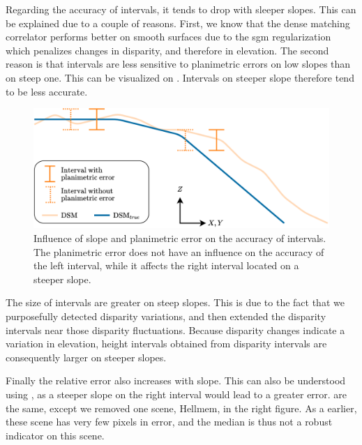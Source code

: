 Regarding the accuracy of intervals, it tends to drop with sleeper slopes. This can be explained due to a couple of reasons. First, we know that the dense matching correlator performs better on smooth surfaces due to the \acrshort{sgm} regularization which penalizes changes in disparity, and therefore in elevation. The second reason is that intervals are less sensitive to planimetric errors on low slopes than on steep one. This can be visualized on . Intervals on steeper slope therefore tend to be less accurate.

\begin{figure}
    \centering
    \includegraphics[width=0.7\linewidth]{Images/Chap_6/Slope_effect_error.png}
    \caption{Influence of slope and planimetric error on the accuracy of intervals. The planimetric error does not have an influence on the accuracy of the left interval, while it affects the right interval located on a steeper slope.}
    \label{fig:Slope_effect_error}
\end{figure}

The size of intervals are greater on steep slopes. This is due to the fact that we purposefully detected disparity variations, and then extended the disparity intervals near those disparity fluctuations. Because disparity changes indicate a variation in elevation, height intervals obtained from disparity intervals are consequently larger on steeper slopes. 

Finally the relative error also increases with slope. This can also be understood using , as a steeper slope on the right interval would lead to a greater error.  are the same, except we removed one scene, Hellmem, in the right figure. As a earlier, these scene has very few pixels in error, and the median is thus not a robust indicator on this scene.

